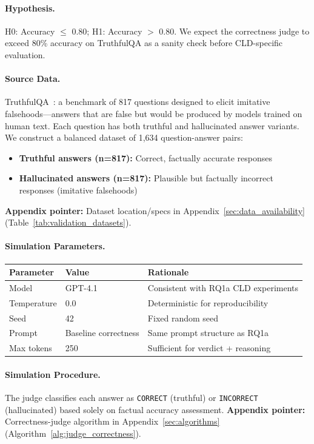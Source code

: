 \paragraph{Hypothesis.}
H0: Accuracy $\leq$ 0.80; H1: Accuracy $>$ 0.80. We expect the correctness judge to exceed 80\% accuracy on TruthfulQA as a sanity check before CLD-specific evaluation.

\paragraph{Source Data.}
TruthfulQA~\cite{lin2022truthfulqa}: a benchmark of 817 questions designed to elicit imitative falsehoods---answers that are false but would be produced by models trained on human text. Each question has both truthful and hallucinated answer variants. We construct a balanced dataset of 1,634 question-answer pairs:
\begin{itemize}[noitemsep]
    \item \textbf{Truthful answers (n=817):} Correct, factually accurate responses
    \item \textbf{Hallucinated answers (n=817):} Plausible but factually incorrect responses (imitative falsehoods)
\end{itemize}
\textbf{Appendix pointer:} Dataset location/specs in Appendix~\ref{sec:data_availability} (Table~\ref{tab:validation_datasets}).

\paragraph{Simulation Parameters.}
\begin{table}[H]
\centering
\footnotesize
\begin{tabular}{@{}l l l@{}}
\toprule
\textbf{Parameter} & \textbf{Value} & \textbf{Rationale} \\
\midrule
Model & GPT-4.1 & Consistent with RQ1a CLD experiments \\
Temperature & 0.0 & Deterministic for reproducibility \\
Seed & 42 & Fixed random seed \\
Prompt & Baseline correctness & Same prompt structure as RQ1a \\
Max tokens & 250 & Sufficient for verdict + reasoning \\
\bottomrule
\end{tabular}
\end{table}

\paragraph{Simulation Procedure.}
The judge classifies each answer as \texttt{CORRECT} (truthful) or \texttt{INCORRECT} (hallucinated) based solely on factual accuracy assessment.
\textbf{Appendix pointer:} Correctness-judge algorithm in Appendix~\ref{sec:algorithms} (Algorithm~\ref{alg:judge_correctness}).

